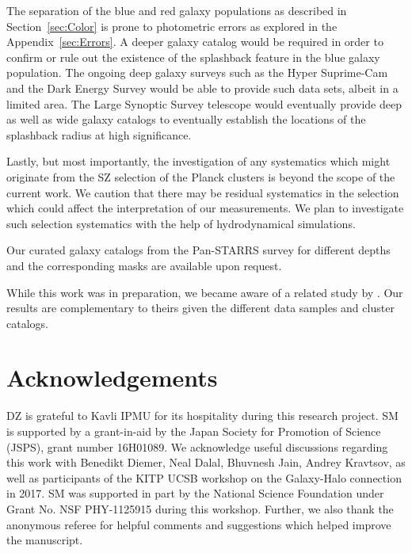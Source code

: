 \documentclass[iop, apjl, twocolappendix, numberedappendix]{emulateapj}
\begin{document}
The separation of the blue and red galaxy populations as described in
Section~\ref{sec:Color} is prone to photometric errors as explored in
the Appendix~\ref{sec:Errors}. A deeper galaxy catalog would be required in order to
confirm or rule out the existence of the splashback feature in the
blue galaxy population. The ongoing deep galaxy surveys such as the
Hyper Suprime-Cam \citep{Aihara2018} and the Dark Energy Survey \citep{Abbott2018} would be able
to provide such data sets, albeit in a limited area. The Large
Synoptic Survey telescope \citep{LSST2009} would eventually provide deep as well
as wide galaxy catalogs to eventually establish the locations of the
splashback radius at high significance.

Lastly, but most importantly, the investigation of any systematics
which might originate from the SZ selection of the Planck clusters
is beyond the scope of the current work. We caution that there may
be residual systematics in the selection which could affect the
interpretation of our measurements. We plan to investigate such
selection systematics with the help of hydrodynamical simulations.

Our curated galaxy catalogs from the Pan-STARRS survey for different
depths and the corresponding masks are available upon request.

While this work was in preparation, we became aware of a related study
by \citet{shin2018des}. Our results are complementary to theirs given
the different data samples and cluster catalogs.

\section*{Acknowledgements}
DZ is grateful to Kavli IPMU for its hospitality during this research
project. SM is supported by a grant-in-aid by the Japan Society for
Promotion of Science (JSPS), grant number 16H01089. We acknowledge
useful discussions regarding this work with Benedikt Diemer, Neal
Dalal, Bhuvnesh Jain, Andrey Kravtsov, as well as participants of the
KITP UCSB workshop on the Galaxy-Halo connection in 2017. SM was
supported in part by the National Science Foundation under Grant No.
NSF PHY-1125915 during this workshop. Further, we also thank the anonymous
referee for helpful comments and suggestions which helped improve the
manuscript.
\end{document}
